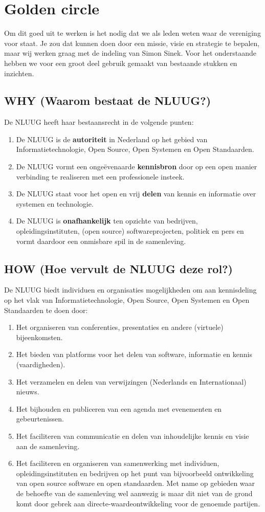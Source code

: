 \documentclass{article}
\begin{document}
\section{Golden circle}
Om dit goed uit te werken is het nodig dat we als leden weten waar de vereniging voor staat. Je zou dat kunnen doen door een missie, visie en strategie te bepalen, maar wij werken graag met de indeling van Simon Sinek. Voor het onderstaande hebben we voor een groot deel gebruik gemaakt van bestaande stukken en inzichten.

\subsection{WHY (Waarom bestaat de NLUUG?)}
De NLUUG heeft haar bestaansrecht in de volgende punten:
\begin{enumerate}
    \item De NLUUG is de \textbf{autoriteit} in Nederland op het gebied van Informatietechnologie, Open Source, Open Systemen en Open Standaarden.
    \item De NLUUG vormt een onge\"evenaarde \textbf{kennisbron} door op een open manier verbinding te realiseren met een professionele insteek.
    \item De NLUUG staat voor het open en vrij \textbf{delen} van kennis en informatie over systemen en technologie.
    \item De NLUUG is \textbf{onafhankelijk} ten opzichte van bedrijven, opleidingsinstituten, (open source) softwareprojecten, politiek en pers en vormt daardoor een onmisbare spil in de samenleving.
\end{enumerate}

\subsection{HOW (Hoe vervult de NLUUG deze rol?)}
De NLUUG biedt individuen en organisaties mogelijkheden om aan kennisdeling op het vlak van Informatietechnologie, Open Source, Open Systemen en Open Standaarden te doen door:
\begin{enumerate}
    \item Het organiseren van conferenties, presentaties en andere (virtuele) bijeenkomsten.
    \item Het bieden van platforms voor het delen van software, informatie en kennis (vaardigheden).
    \item Het verzamelen en delen van verwijzingen (Nederlands en Internationaal) nieuws.
    \item Het bijhouden en publiceren van een agenda met evenementen en gebeurtenissen.
    \item Het faciliteren van communicatie en delen van inhoudelijke kennis en visie aan de samenleving.
    \item Het faciliteren en organiseren van samenwerking met individuen, opleidingsinstituten en bedrijven op het punt van bijvoorbeeld ontwikkeling van open source software en open standaarden. Met name op gebieden waar de behoefte van de samenleving wel aanwezig is maar dit niet van de grond komt door gebrek aan directe-waardeontwikkeling voor de genoemde partijen.
\end{enumerate}
\end{document}

